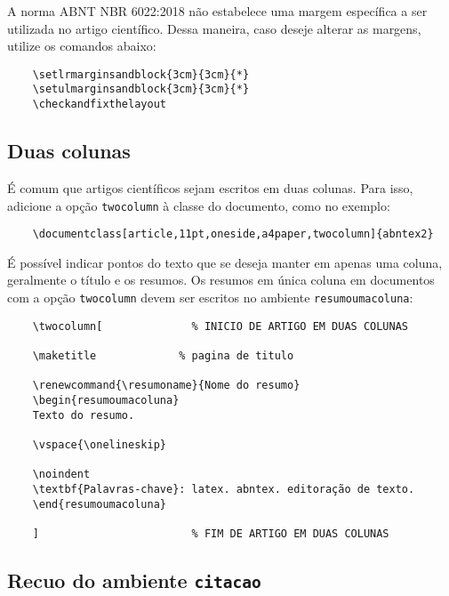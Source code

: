 \documentclass[
article,			%
11pt,				%
oneside,			%
a4paper,			%
english,			%
brazil,				%
sumario=tradicional,
]{abntex2}
\begin{document}
	A norma ABNT NBR 6022:2018 não estabelece uma margem específica a ser utilizada
	no artigo científico. Dessa maneira, caso deseje alterar as margens, utilize os
	comandos abaixo:
	
	\begin{verbatim}
	\setlrmarginsandblock{3cm}{3cm}{*}
	\setulmarginsandblock{3cm}{3cm}{*}
	\checkandfixthelayout
	\end{verbatim}
	
	\subsection{Duas colunas}
	
	É comum que artigos científicos sejam escritos em duas colunas. Para isso,
	adicione a opção \texttt{twocolumn} à classe do documento, como no exemplo:
	
	\begin{verbatim}
	\documentclass[article,11pt,oneside,a4paper,twocolumn]{abntex2}
	\end{verbatim}
	
	É possível indicar pontos do texto que se deseja manter em apenas uma coluna,
	geralmente o título e os resumos. Os resumos em única coluna em documentos com
	a opção \texttt{twocolumn} devem ser escritos no ambiente
	\texttt{resumoumacoluna}:
	
	\begin{verbatim}
	\twocolumn[              % INICIO DE ARTIGO EM DUAS COLUNAS
	
	\maketitle             % pagina de titulo
	
	\renewcommand{\resumoname}{Nome do resumo}
	\begin{resumoumacoluna}
	Texto do resumo.
	
	\vspace{\onelineskip}
	
	\noindent
	\textbf{Palavras-chave}: latex. abntex. editoração de texto.
	\end{resumoumacoluna}
	
	]                        % FIM DE ARTIGO EM DUAS COLUNAS
	\end{verbatim}
	
	\subsection{Recuo do ambiente \texttt{citacao}}
	
\end{document}
